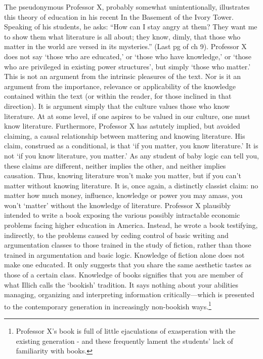 The pseudonymous Professor X, probably somewhat unintentionally, illustrates this theory of education in his recent In the Basement of the Ivory Tower. Speaking of his students, he asks:
``How can I stay angry at them? They want me to show them what literature is all about; they know, dimly, that those who matter in the world are versed in its mysteries.'' (Last pg of ch 9).
Professor X does not say `those who are educated,' or `those who have knowledge,' or `those who are privileged in existing power structures', but simply `those who matter.' This is not an argument from the intrinsic pleasures of the text. Nor is it an argument from the importance, relevance or applicability of the knowledge contained within the text (or within the reader, for those inclined in that direction). It is argument simply that the culture values those who know literature. At at some level, if one aspires to be valued in our culture, one must know literature.
Furthermore, Professor X has astutely implied, but avoided claiming, a causal relationship between mattering and knowing literature. His claim, construed as a conditional, is that `if you matter, you know literature.' It is not `if you know literature, you matter.' As any student of baby logic can tell you, these claims are different, neither implies the other, and neither implies causation. Thus, knowing literature won't make you matter, but if you can't matter without knowing literature. It is, once again, a distinctly classist claim: no matter how much money, influence, knowledge or power you may amass, you won't `matter' without the knowledge of literature.
Professor X plausibly intended to write a book exposing the various possibly intractable economic problems facing higher education in America. Instead, he wrote a book testifying, indirectly, to the problems caused by ceding control of basic writing and argumentation classes to those trained in the study of fiction, rather than those trained in argumentation and basic logic.
Knowledge of fiction alone does not make one educated. It only suggests that you share the same aesthetic tastes as those of a certain class. Knowledge of books signifies that you are member of what Illich calls the `bookish' tradition. It says nothing about your abilities managing, organizing and interpreting information critically---which is presented to the contemporary generation in increasingly non-bookish ways.\footnote{Professor X's book is full of little ejaculations of exasperation with the existing generation - and these frequently lament the students' lack of familiarity with books.}
